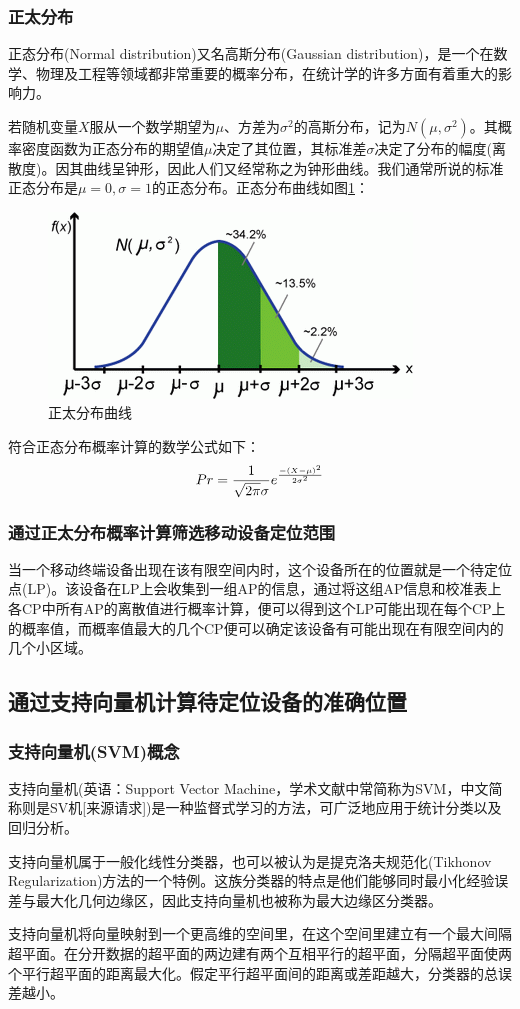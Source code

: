 \documentclass[UTF8, twocolumn ]{ctexart}
\begin{document}
\subsubsection{正太分布}
正态分布(Normal distribution)又名高斯分布(Gaussian distribution)，是一个在数学、物理及工程等领域都非常重要的概率分布，在统计学的许多方面有着重大的影响力。
\par
若随机变量$X$服从一个数学期望为$\mu$、方差为$\sigma^{2}$的高斯分布，记为$N(\mu,\sigma^{2})$。其概率密度函数为正态分布的期望值$\mu$决定了其位置，其标准差$\sigma$决定了分布的幅度(离散度)。因其曲线呈钟形，因此人们又经常称之为钟形曲线。我们通常所说的标准正态分布是$\mu=0,\sigma=1$的正态分布。正态分布曲线如图\ref{fig:no6}：
\begin{figure}[!ht]\centering
  \includegraphics[keepaspectratio, scale=0.7]{no6.png}
  \caption{正太分布曲线\label{fig:no6}} 
\end{figure}
\par
符合正态分布概率计算的数学公式如下：
\begin{equation}\centering
  Pr=\frac{1}{\sqrt{2\pi}\sigma}e^{\frac{-(X-\mu)^{2}}{2\sigma^{2}}}
\end{equation}
\subsubsection{通过正太分布概率计算筛选移动设备定位范围}
当一个移动终端设备出现在该有限空间内时，这个设备所在的位置就是一个待定位点(LP)。该设备在LP上会收集到一组AP的信息，通过将这组AP信息和校准表上各CP中所有AP的离散值进行概率计算，便可以得到这个LP可能出现在每个CP上的概率值，而概率值最大的几个CP便可以确定该设备有可能出现在有限空间内的几个小区域。

\subsection{通过支持向量机计算待定位设备的准确位置}
\subsubsection{支持向量机(SVM)概念}
支持向量机(英语：Support Vector Machine，学术文献中常简称为SVM，中文简称则是SV机[来源请求])是一种监督式学习的方法，可广泛地应用于统计分类以及回归分析。
\par
支持向量机属于一般化线性分类器，也可以被认为是提克洛夫规范化(Tikhonov Regularization)方法的一个特例。这族分类器的特点是他们能够同时最小化经验误差与最大化几何边缘区，因此支持向量机也被称为最大边缘区分类器。
\par
支持向量机将向量映射到一个更高维的空间里，在这个空间里建立有一个最大间隔超平面。在分开数据的超平面的两边建有两个互相平行的超平面，分隔超平面使两个平行超平面的距离最大化。假定平行超平面间的距离或差距越大，分类器的总误差越小。
\end{document}
